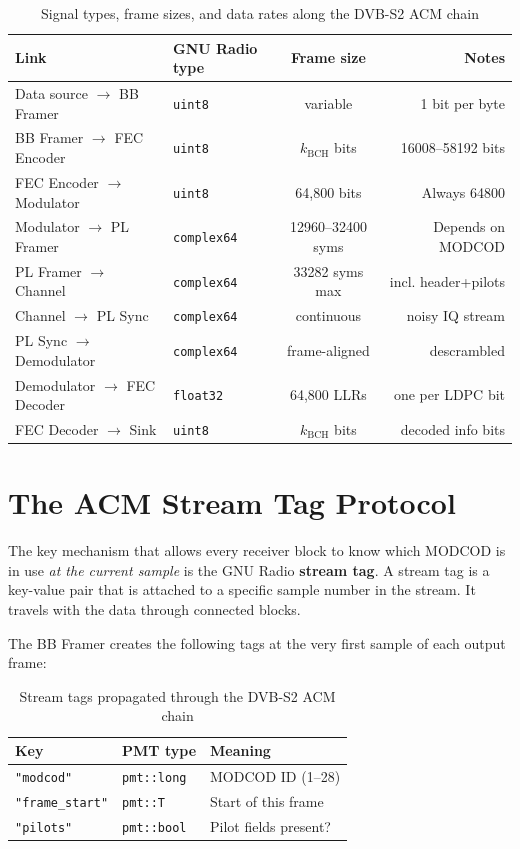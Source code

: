\documentclass[12pt,a4paper]{report}
\begin{document}
\begin{table}[H]
\centering
\caption{Signal types, frame sizes, and data rates along the DVB-S2 ACM chain}
\label{tab:signal_flow}
\begin{tabular}{llcr}
\toprule
\textbf{Link} & \textbf{GNU Radio type} & \textbf{Frame size} & \textbf{Notes}\\
\midrule
Data source $\to$ BB Framer     & \texttt{uint8}    & variable    & 1 bit per byte \\
BB Framer $\to$ FEC Encoder     & \texttt{uint8}    & $k_\text{BCH}$ bits & 16008--58192 bits \\
FEC Encoder $\to$ Modulator     & \texttt{uint8}    & 64,800 bits & Always 64800 \\
Modulator $\to$ PL Framer       & \texttt{complex64}& 12960--32400 syms & Depends on MODCOD \\
PL Framer $\to$ Channel         & \texttt{complex64}& 33282 syms max & incl. header+pilots \\
Channel $\to$ PL Sync           & \texttt{complex64}& continuous  & noisy IQ stream \\
PL Sync $\to$ Demodulator       & \texttt{complex64}& frame-aligned & descrambled \\
Demodulator $\to$ FEC Decoder   & \texttt{float32}  & 64,800 LLRs & one per LDPC bit \\
FEC Decoder $\to$ Sink          & \texttt{uint8}    & $k_\text{BCH}$ bits & decoded info bits \\
\bottomrule
\end{tabular}
\end{table}

\section{The ACM Stream Tag Protocol}

The key mechanism that allows every receiver block to know which MODCOD is in
use \emph{at the current sample} is the GNU Radio \textbf{stream tag}. A stream
tag is a key-value pair that is attached to a specific sample number in the
stream. It travels with the data through connected blocks.

The BB Framer creates the following tags at the very first sample of each
output frame:

\begin{table}[H]
\centering
\caption{Stream tags propagated through the DVB-S2 ACM chain}
\label{tab:tags}
\begin{tabular}{lll}
\toprule
\textbf{Key}         & \textbf{PMT type}    & \textbf{Meaning} \\
\midrule
\texttt{"modcod"}    & \texttt{pmt::long}   & MODCOD ID (1--28) \\
\texttt{"frame\_start"} & \texttt{pmt::T}   & Start of this frame \\
\texttt{"pilots"}    & \texttt{pmt::bool}   & Pilot fields present? \\
\bottomrule
\end{tabular}
\end{table}
\end{document}
